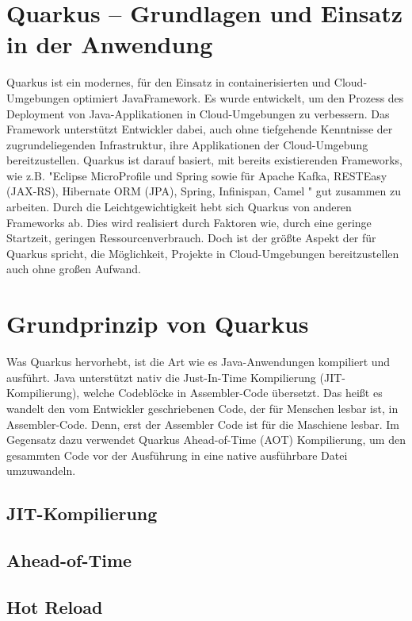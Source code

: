 \section{Quarkus – Grundlagen und Einsatz in der Anwendung}
Quarkus ist ein modernes, für den Einsatz in containerisierten und Cloud-Umgebungen optimiert JavaFramework.
Es wurde entwickelt, um den Prozess des Deployment von Java-Applikationen in Cloud-Umgebungen zu verbessern.
Das Framework unterstützt Entwickler dabei, auch ohne tiefgehende Kenntnisse der zugrundeliegenden Infrastruktur, ihre Applikationen der Cloud-Umgebung bereitzustellen.
Quarkus ist darauf basiert, mit bereits existierenden Frameworks, wie 
z.B. "Eclipse MicroProfile und Spring sowie für Apache Kafka, RESTEasy (JAX-RS), Hibernate ORM (JPA), Spring, Infinispan, Camel "
gut zusammen zu arbeiten.
Durch die Leichtgewichtigkeit hebt sich Quarkus von anderen Frameworks ab. Dies wird realisiert durch Faktoren wie, durch eine geringe Startzeit,
geringen Ressourcenverbrauch. Doch ist der größte Aspekt der für Quarkus spricht, die Möglichkeit, Projekte in Cloud-Umgebungen bereitzustellen auch ohne großen Aufwand. 

\section{Grundprinzip von Quarkus}
Was Quarkus hervorhebt, ist die Art wie es Java-Anwendungen kompiliert und ausführt.
Java unterstützt nativ die Just-In-Time Kompilierung (JIT-Kompilierung), welche Codeblöcke in Assembler-Code übersetzt. 
Das heißt es wandelt den vom Entwickler geschriebenen Code, der für Menschen lesbar ist, in Assembler-Code. 
Denn, erst der Assembler Code ist für die Maschiene lesbar.
Im Gegensatz dazu verwendet Quarkus Ahead-of-Time (AOT) Kompilierung, um den gesammten Code vor der Ausführung in eine native ausführbare Datei umzuwandeln. 

\subsection{JIT-Kompilierung}

\subsection{Ahead-of-Time}

\subsection{Hot Reload}

